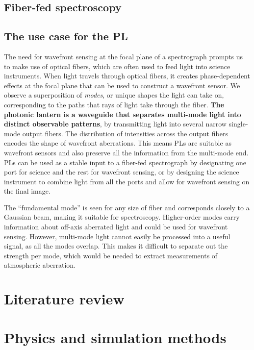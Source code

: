 \documentclass[12pt]{article}
\begin{document}
\subsection{Fiber-fed spectroscopy}

\subsection{The use case for the PL}

The need for wavefront sensing at the focal plane of a spectrograph prompts us to make use of optical fibers, which are often used to feed light into science instruments. When light travels through optical fibers, it creates phase-dependent effects at the focal plane that can be used to construct a wavefront sensor. We observe a superposition of \textit{modes}, or unique shapes the light can take on, corresponding to the paths that rays of light take through the fiber. \textbf{The photonic lantern is a waveguide that separates multi-mode light into distinct observable patterns}, by transmitting light into several narrow single-mode output fibers. The distribution of intensities across the output fibers encodes the shape of wavefront aberrations. This means PLs are suitable as wavefront sensors \parencite{Norris20} and also preserve all the information from the multi-mode end. PLs can be used as a stable input to a fiber-fed spectrograph by designating one port for science and the rest for wavefront sensing, or by designing the science instrument to combine light from all the ports and allow for wavefront sensing on the final image.

The ``fundamental mode'' is seen for any size of fiber and corresponds closely to a Gaussian beam, making it suitable for spectroscopy. Higher-order modes carry information about off-axis aberrated light and could be used for wavefront sensing. However, multi-mode light cannot easily be processed into a useful signal, as all the modes overlap. This makes it difficult to separate out the strength per mode, which would be needed to extract measurements of atmospheric aberration.

\section{Literature review}



\section{Physics and simulation methods}
\end{document}

